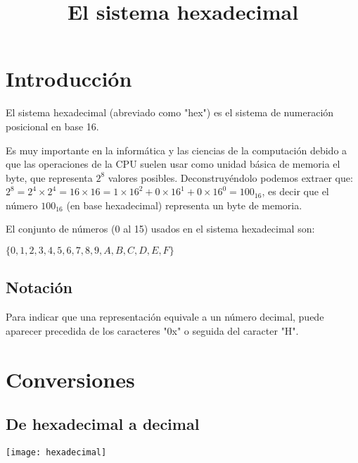 \documentclass{article}
\title{El sistema hexadecimal}
\author{}
\date{}
\begin{document}
\maketitle

\section{Introducción}
El sistema hexadecimal (abreviado como "hex") es el sistema de numeración posicional en base 16.

Es muy importante en la informática y las ciencias de la computación debido a que las operaciones de la CPU suelen usar como unidad básica de memoria el byte, que representa $2^8$ valores posibles. Deconstruyéndolo podemos extraer que: $2^8 = 2^4 \times 2^4 = 16 \times 16 = 1 \times 16^2 + 0 \times 16^1 + 0 \times 16^0 = 100_{16}$, es decir que el número $100_{16}$ (en base hexadecimal) representa un byte de memoria.

El conjunto de números (0 al 15) usados en el sistema hexadecimal son:
\begin{center}
$\{0,1,2,3,4,5,6,7,8,9,A,B,C,D,E,F\}$
\end{center}

\subsection{Notación}
Para indicar que una representación equivale a un número decimal, puede aparecer precedida de los caracteres "0x" o seguida del caracter "H".

\section{Conversiones}
\subsection{De hexadecimal a decimal}
\texttt{[image: hexadecimal]}
\end{document}
